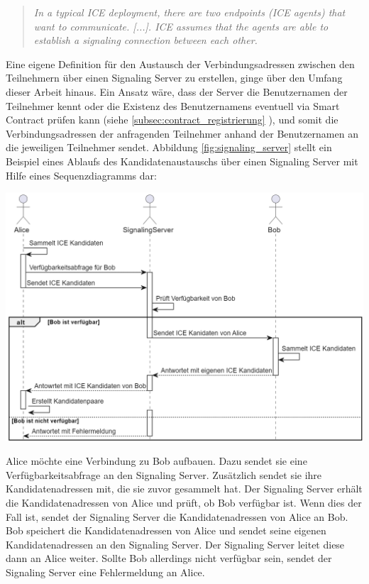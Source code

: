 \begin{quote}
    \textit{In a typical ICE deployment, there are two endpoints (ICE agents)
    that want to communicate. [...]. ICE assumes that the agents are able to
    establish a signaling connection between each other.} \parencite[S. 7]{rfc8445_ICE}
\end{quote}

\noindent Eine eigene Definition für den Austausch der Verbindungsadressen zwischen den Teilnehmern über einen Signaling Server zu erstellen, ginge über den Umfang dieser Arbeit hinaus. Ein Ansatz wäre, dass der Server die Benutzernamen der Teilnehmer kennt oder die Existenz des Benutzernamens eventuell via Smart Contract prüfen kann (siehe \ref{subsec:contract_registrierung} \textit{}), und somit die Verbindungsadressen der anfragenden Teilnehmer anhand der Benutzernamen an die jeweiligen Teilnehmer sendet. Abbildung \ref{fig:signaling_server} stellt ein Beispiel eines Ablaufs des Kandidatenaustauschs über einen Signaling Server mit Hilfe eines Sequenzdiagramms dar:

\begin{center}
    \captionsetup{type=figure}
    \includegraphics[width=1.0\linewidth]{images/signaling_sequence.png}
    \label{fig:signaling_server}
\end{center}

\noindent Alice möchte eine Verbindung zu Bob aufbauen. Dazu sendet sie eine Verfügbarkeitsabfrage an den Signaling Server. Zusätzlich sendet sie ihre Kandidatenadressen mit, die sie zuvor gesammelt hat. Der Signaling Server erhält die Kandidatenadressen von Alice und prüft, ob Bob verfügbar ist. Wenn dies der Fall ist, sendet der Signaling Server die Kandidatenadressen von Alice an Bob. Bob speichert die Kandidatenadressen von Alice und sendet seine eigenen Kandidatenadressen an den Signaling Server. Der Signaling Server leitet diese dann an Alice weiter. Sollte Bob allerdings nicht verfügbar sein, sendet der Signaling Server eine Fehlermeldung an Alice. 

